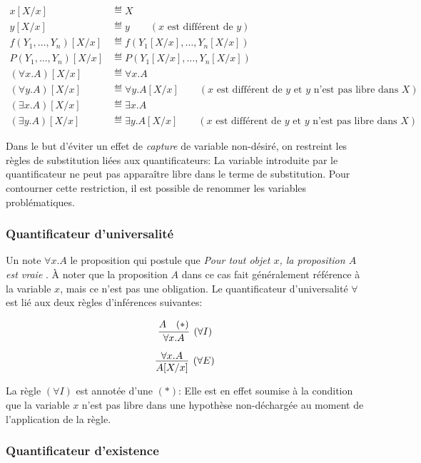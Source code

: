 \begin{align*}
x[X / x] &\eqdef X \\
y[X / x] &\eqdef y \hspace{2em} (x \text{ est différent de } y)\\
f(Y_1, \dots, Y_n)[X / x] &\eqdef f(Y_1[X / x], \dots, Y_n[X / x])\\
P(Y_1, \dots, Y_n)[X / x] &\eqdef P(Y_1[X / x], \dots, Y_n[X / x])\\
(\forall x. A)[X / x] &\eqdef \forall x. A\\
(\forall y. A)[X / x] &\eqdef \forall y. A[X / x] \hspace{2em} (x \text{ est différent de } y \text{ et $y$ n'est pas libre dans $X$})\\
(\exists x. A)[X / x] &\eqdef \exists x. A\\
(\exists y. A)[X / x] &\eqdef \exists y. A[X / x] \hspace{2em} (x \text{ est différent de } y \text{ et $y$ n'est pas libre dans $X$})
\end{align*}

Dans le but d'éviter un effet de \textit{capture} de variable non-désiré, on restreint les règles de substitution liées aux quantificateurs:
La variable introduite par le quantificateur ne peut pas apparaître libre dans le terme de substitution.
Pour contourner cette restriction, il est possible de renommer les variables problématiques.

\subsubsection{Quantificateur d'universalité}

Un note $\forall x. A$ le proposition qui postule que \og \textit{Pour tout objet $x$, la proposition $A$ est vraie} \fg{}.
À noter que la proposition $A$ dans ce cas fait généralement référence à la variable $x$, mais ce n'est pas une obligation.
Le quantificateur d'universalité $\forall$ est lié aux deux règles d'inférences suivantes:

\[
\infer[({\forall}I)]{\forall x. A}{A & (*)}
\]

\[
\infer[({\forall}E)]{A[X / x]}{\forall x. A}
\]

La règle $({\forall}I)$ est annotée d'une $(*)$: Elle est en effet soumise à la condition que la variable $x$ n'est pas libre dans une hypothèse non-déchargée au moment de l'application de la règle.

\subsubsection{Quantificateur d'existence}


